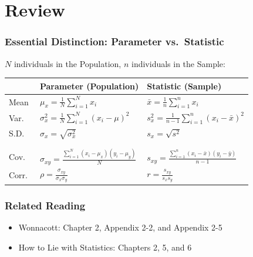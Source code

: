 \documentclass{beamer}
\begin{document}
\section{Review}
\begin{frame}
\frametitle{Essential Distinction: Parameter vs.\ Statistic}
	$N$ individuals in the Population, $n$ individuals in the Sample:
	\vspace{1em}
	\small
	\begin{tabular}{l|l|l}
		&\textbf{Parameter} (Population)&\textbf{Statistic} (Sample)\\
		\hline
		Mean&$\displaystyle\mu_x = \frac{1}{N} \sum_{i = 1}^N x_i$& $\displaystyle\bar{x} = \frac{1}			{n} \sum_{i = 1}^n x_i$ \\
		Var.\ &$\displaystyle \sigma_x^2 = \frac{1}{N}\sum_{i = 1}^N (x_i - \mu)^2$ &$\displaystyle 			s_x^2 = \frac{1}{n - 1}\sum_{i = 1}^n(x_i - \bar{x})^2$\\
		S.D.\ &$\sigma_x = \sqrt{\sigma_x^2}$ &$s_x = \sqrt{s^2}$ \\
		&&\\
		\hline
		&&\\
		\alert{Cov.\ }&\alert{$\displaystyle \sigma_{xy} = \frac{\sum_{i = 1}^N(x_i - \mu_x)(y_i - 				\mu_y)}{N}$} &\alert{$\displaystyle s_{xy} = \frac{\sum_{i = 1}^n(x_i - \bar{x})(y_i - \bar{y})}			{n - 1}$}\\
		\alert{Corr.\ } & \alert{$\displaystyle \rho = \frac{\sigma_{xy}}{\sigma_x \sigma_y}$}& 					\alert{$\displaystyle r = \frac{s_{xy}}{s_x s_y}$}
	\end{tabular}
\end{frame}

\begin{frame}
\frametitle{Related Reading}
	\begin{itemize}
		\item Wonnacott: Chapter 2, Appendix 2-2, and Appendix 2-5
		\item How to Lie with Statistics: Chapters 2, 5, and 6
	\end{itemize}
\end{frame}

\end{document}
